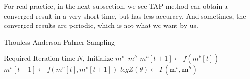 For real practice, in the next subsection, we see TAP method can obtain a converged result in a very short time, but has less accuracy. And sometimes, the converged results are periodic, which is not what we want by us.

	\begin{algorithm}
        \caption{Thouless-Anderson-Palmer Sampling}
        \begin{algorithmic}
        	\Require Required Iteration time $N$, 
        	\State Initialize $m^{v}$, $m^{h}$ 
            	\State $m^{h}{[t+1]} \gets f(m^{h}{[t]})$
            	\State $m^{v}{[t+1]} \gets f(m^{v}{[t]},m^{v}{[t+1]})$
			\EndFor
			\State $logZ(\theta) \gets \Gamma(\mathbf m^{v},\mathbf m^{h})$
        \end{algorithmic}
    \end{algorithm}
